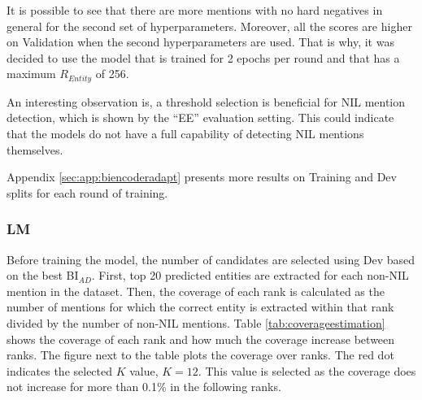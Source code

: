 \documentclass{report}
\theoremstyle{definition}
\theoremstyle{remark}
\begin{document}
It is possible to see that there are more mentions with no hard negatives in general for the second set of hyperparameters. Moreover, all the scores are higher on Validation when the second hyperparameters are used. That is why, it was decided to use the model that is trained for 2 epochs per round and that has a maximum $R_{Entity}$ of 256.

An interesting observation is, a threshold selection is beneficial for NIL mention detection, which is shown by the ``EE'' evaluation setting. This could indicate that the models do not have a full capability of detecting NIL mentions themselves. 

Appendix \ref{sec:app:biencoderadapt} presents more results on Training and Dev splits for each round of training.
\subsubsection{LM}
Before training the model, the number of candidates are selected using Dev based on the best BI$_{AD}$. First, top 20 predicted entities are extracted for each non-NIL mention in the dataset. Then, the coverage of each rank is calculated as the number of mentions for which the correct entity is extracted within that rank divided by the number of non-NIL mentions. Table \ref{tab:coverageestimation} shows the coverage of each rank and how much the coverage increase between ranks. The figure next to the table plots the coverage over ranks. The red dot indicates the selected $K$ value, $K=12$. This value is selected as the coverage does not increase for more than 0.1\% in the following ranks.
\end{document}
